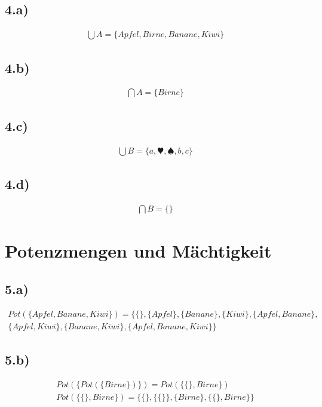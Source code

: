 \documentclass[10pt,ngerman]{scrartcl}
\begin{document}
\subsection{4.a)}
\setcounter{equation}{0}
\begin{align*}
\bigcup A =\{Apfel,Birne,Banane,Kiwi\}
\end{align*}

\subsection{4.b)}
\setcounter{equation}{0}
\begin{align*}
\bigcap A =\{Birne\}
\end{align*}

\subsection{4.c)}
\setcounter{equation}{0}
\begin{align*}
\bigcup B =\{a,\varheart,\spadesuit,b,c\}
\end{align*}

\subsection{4.d)}
\setcounter{equation}{0}
\begin{align*}
\bigcap B =\{\}
\end{align*}
\pagebreak
\section{Potenzmengen und Mächtigkeit}
\subsection{5.a)}
\setcounter{equation}{0}
\begin{align*}
Pot(\{Apfel,Banane,Kiwi\}) = \{\{\},\{Apfel\},\{Banane\},\{Kiwi\},\{Apfel,Banane\},\\
\{Apfel,Kiwi\},\{Banane,Kiwi\},\{Apfel,Banane,Kiwi\}\}
\end{align*}
\subsection{5.b)}
\setcounter{equation}{0}
\begin{align}
Pot(\{Pot(\{Birne\})\}) = Pot(\{\{\},Birne\})\\
Pot(\{\{\},Birne\}) = \{\{\},\{\{\}\},\{Birne\},\{\{\},Birne\}\}
\end{align}
\end{document}
